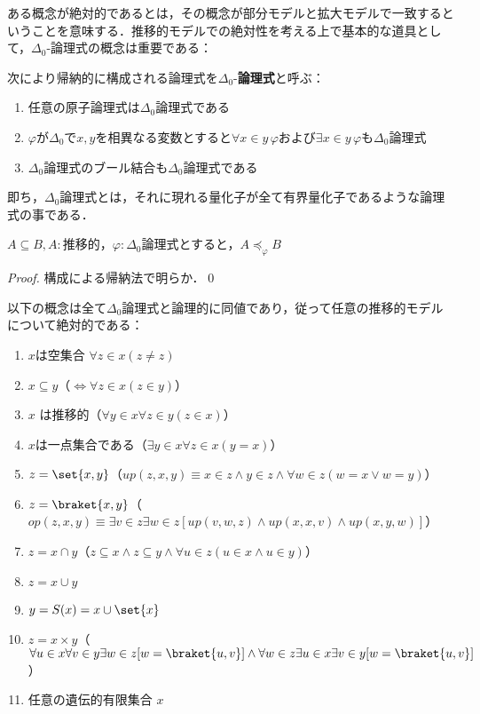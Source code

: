 \documentclass[a4j]{ltjsarticle}
\begin{document}
ある概念が絶対的であるとは，その概念が部分モデルと拡大モデルで一致するということを意味する．推移的モデルでの絶対性を考える上で基本的な道具として，$\Delta_0$-論理式の概念は重要である：

\begin{definition}
 次により帰納的に構成される論理式を$\Delta_0$-{\bfseries 論理式}と呼ぶ：

 \begin{enumerate}[label=(\alph*)]
  \item 任意の原子論理式は$\Delta_0$論理式である
  \item $\varphi$が$\Delta_0$で$x, y$を相異なる変数とすると$\forall x \in y\, \varphi$および$\exists x \in y\, \varphi$も$\Delta_0$論理式
  \item $\Delta_0$論理式のブール結合も$\Delta_0$論理式である
 \end{enumerate}

 即ち，$\Delta_0$論理式とは，それに現れる量化子が全て有界量化子であるような論理式の事である．
\end{definition}

\begin{theorem}
 $A \subseteq B, A:$推移的，$\varphi: \Delta_0$論理式とすると，$A \preccurlyeq_\varphi B$
\end{theorem}
\begin{proof}
 構成による帰納法で明らか．\qed
\end{proof}

\begin{theorem}
 以下の概念は全て$\Delta_0$論理式と論理的に同値であり，従って任意の推移的モデルについて絶対的である：
 \begin{enumerate}
  \item $x$は空集合 $\forall z \in x (z \neq z)$
  \item $x \subseteq y $（$\Leftrightarrow \forall z \in x (z \in y)$）
  \item $x$ は推移的（$\forall y \in x \forall z \in y (z \in x)$）
  \item $x$は一点集合である（$\exists y \in x \forall z \in x (y = x)$）
  \item $z = \set{x, y}$（$up(z,x,y) \equiv x \in z \wedge y \in z \wedge \forall w \in z (w = x \vee w = y)$）
  \item $z = \braket{x, y}$（$op(z,x,y) \equiv \exists v \in z \exists w \in z [up(v,w,z) \wedge up(x,x,v) \wedge up(x,y,w)]$）
  \item $z = x \cap y$（$z \subseteq x \wedge z \subseteq y \wedge \forall u \in z(u \in x \wedge u \in y)$）
  \item $z = x \cup y$
  \item $y = S(x) = x \cup \set{x}$
  \item $z = x \times y$（$\forall u \in x \forall v \in y \exists w \in z [w = \braket{u,v}] \wedge \forall w \in z \exists u \in x \exists v \in y [w = \braket{u,v}]$）
  \item 任意の遺伝的有限集合 $x$
 \end{enumerate}
\end{theorem}
\end{document}
